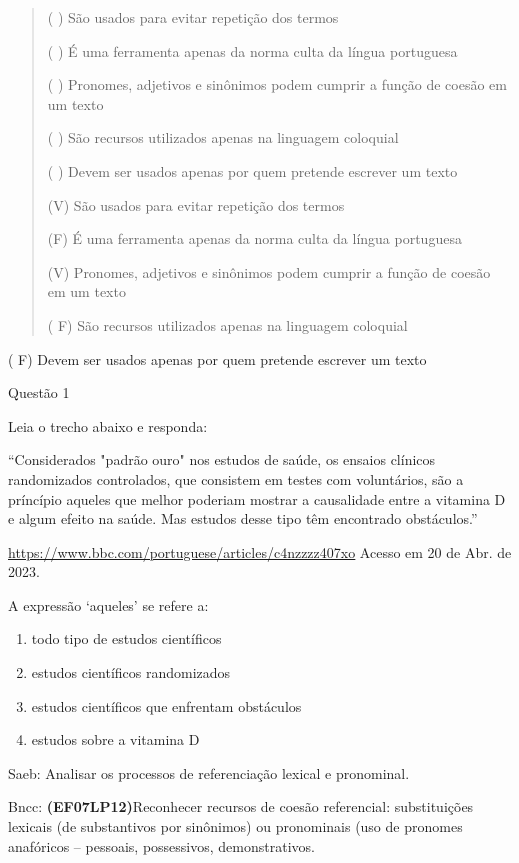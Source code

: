{\begin{quote}
( ) São usados para evitar repetição dos termos

( ) É uma ferramenta apenas da norma culta da língua portuguesa

( ) Pronomes, adjetivos e sinônimos podem cumprir a função de coesão em
um texto

( ) São recursos utilizados apenas na linguagem coloquial

( ) Devem ser usados apenas por quem pretende escrever um texto

(V) São usados para evitar repetição dos termos

(F) É uma ferramenta apenas da norma culta da língua portuguesa

(V) Pronomes, adjetivos e sinônimos podem cumprir a função de coesão em
um texto

( F) São recursos utilizados apenas na linguagem coloquial
\end{quote}

( F) Devem ser usados apenas por quem pretende escrever um texto


Questão 1

Leia o trecho abaixo e responda:

``Considerados "padrão ouro" nos estudos de saúde, os ensaios clínicos
randomizados controlados, que consistem em testes com voluntários, são a
príncípio aqueles que melhor poderiam mostrar a causalidade entre a
vitamina D e algum efeito na saúde. Mas estudos desse tipo têm
encontrado obstáculos.''

\href{https://www.bbc.com/portuguese/articles/c4nzzzz407xo}{\uline{https://www.bbc.com/portuguese/articles/c4nzzzz407xo}}
Acesso em 20 de Abr. de 2023.

A expressão `aqueles' se refere a:

\begin{enumerate}
\def\labelenumi{\alph{enumi})}
\item
  todo tipo de estudos científicos
\item
  estudos científicos randomizados
\item
  estudos científicos que enfrentam obstáculos
\item
  estudos sobre a vitamina D
\end{enumerate}

Saeb: Analisar os processos de referenciação lexical e pronominal.

Bncc: \textbf{(EF07LP12)}Reconhecer recursos de coesão referencial:
substituições lexicais (de substantivos por sinônimos) ou pronominais
(uso de pronomes anafóricos -- pessoais, possessivos, demonstrativos.

}
